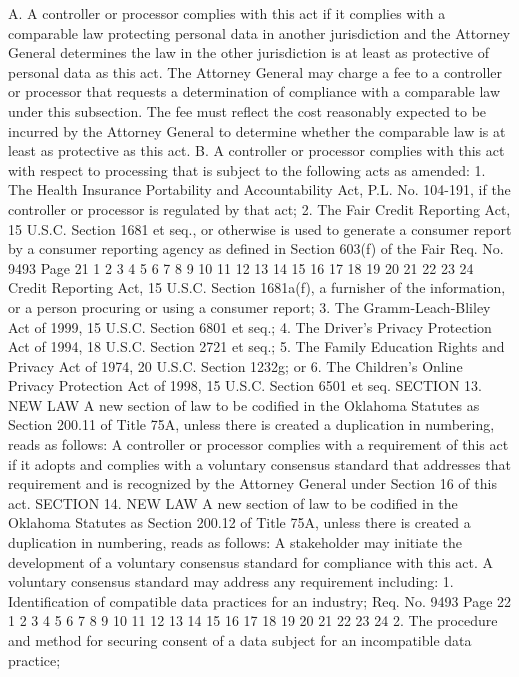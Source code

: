 A. A controller or processor complies with this act if it
complies with a comparable law protecting personal data in another
jurisdiction and the Attorney General determines the law in the
other jurisdiction is at least as protective of personal data as
this act. The Attorney General may charge a fee to a controller or
processor that requests a determination of compliance with a comparable
law under this subsection. The fee must reflect the cost reasonably
expected to be incurred by the Attorney General to determine whether
the comparable law is at least as protective as this act.
B. A controller or processor complies with this act with
respect to processing that is subject to the following acts as
amended:
1. The Health Insurance Portability and Accountability Act,
P.L. No. 104-191, if the controller or processor is regulated by
that act;
2. The Fair Credit Reporting Act, 15 U.S.C. Section 1681 et
seq., or otherwise is used to generate a consumer report by a
consumer reporting agency as defined in Section 603(f) of the Fair 
Req. No. 9493 Page 21
1
2
3
4
5
6
7
8
9
10
11
12
13
14
15
16
17
18
19
20
21
22
23
24
Credit Reporting Act, 15 U.S.C. Section 1681a(f), a furnisher of the
information, or a person procuring or using a consumer report;
3. The Gramm-Leach-Bliley Act of 1999, 15 U.S.C. Section 6801
et seq.;
4. The Driver's Privacy Protection Act of 1994, 18 U.S.C.
Section 2721 et seq.;
5. The Family Education Rights and Privacy Act of 1974, 20
U.S.C. Section 1232g; or
6. The Children's Online Privacy Protection Act of 1998, 15
U.S.C. Section 6501 et seq.
SECTION 13. NEW LAW A new section of law to be codified
in the Oklahoma Statutes as Section 200.11 of Title 75A, unless
there is created a duplication in numbering, reads as follows:
A controller or processor complies with a requirement of this
act if it adopts and complies with a voluntary consensus standard
that addresses that requirement and is recognized by the Attorney
General under Section 16 of this act.
SECTION 14. NEW LAW A new section of law to be codified
in the Oklahoma Statutes as Section 200.12 of Title 75A, unless
there is created a duplication in numbering, reads as follows:
A stakeholder may initiate the development of a voluntary
consensus standard for compliance with this act. A voluntary
consensus standard may address any requirement including:
1. Identification of compatible data practices for an industry;
Req. No. 9493 Page 22
1
2
3
4
5
6
7
8
9
10
11
12
13
14
15
16
17
18
19
20
21
22
23
24
2. The procedure and method for securing consent of a data
subject for an incompatible data practice;
